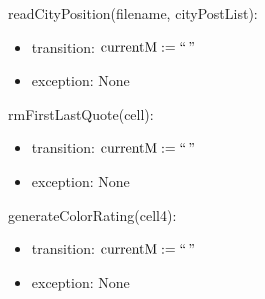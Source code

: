 \documentclass[12pt]{article}
\begin{document}
\noindent readCityPosition(filename, cityPostList):
\begin{itemize}
\item transition: $\mbox{currentM} := ` ` \,  "$
\item exception: None
\end{itemize}

\noindent rmFirstLastQuote(cell):
\begin{itemize}
\item transition: $\mbox{currentM} := ` ` \,  "$
\item exception: None
\end{itemize}

\noindent generateColorRating(cell4):
\begin{itemize}
\item transition: $\mbox{currentM} := ` ` \,  "$
\item exception: None
\end{itemize}
\end{document}
